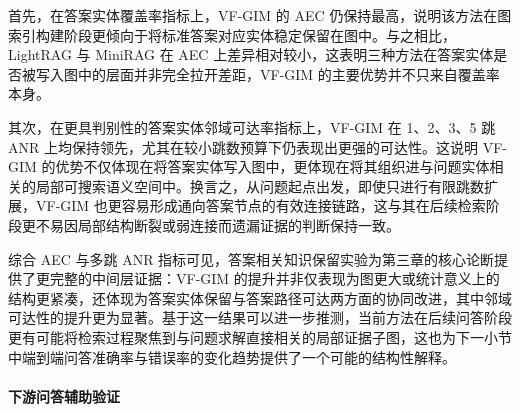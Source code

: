 \documentclass[promaster, vlined]{DissertUESTC}
\begin{document}
首先，在答案实体覆盖率指标上，VF-GIM 的 AEC 仍保持最高，说明该方法在图索引构建阶段更倾向于将标准答案对应实体稳定保留在图中。与之相比，LightRAG 与 MiniRAG 在 AEC 上差异相对较小，这表明三种方法在答案实体是否被写入图中的层面并非完全拉开差距，VF-GIM 的主要优势并不只来自覆盖率本身。

其次，在更具判别性的答案实体邻域可达率指标上，VF-GIM 在 1、2、3、5 跳 ANR 上均保持领先，尤其在较小跳数预算下仍表现出更强的可达性。这说明 VF-GIM 的优势不仅体现在将答案实体写入图中，更体现在将其组织进与问题实体相关的局部可搜索语义空间中。换言之，从问题起点出发，即使只进行有限跳数扩展，VF-GIM 也更容易形成通向答案节点的有效连接链路，这与其在后续检索阶段更不易因局部结构断裂或弱连接而遗漏证据的判断保持一致。

综合 AEC 与多跳 ANR 指标可见，答案相关知识保留实验为第三章的核心论断提供了更完整的中间层证据：VF-GIM 的提升并非仅表现为图更大或统计意义上的结构更紧凑，还体现为答案实体保留与答案路径可达两方面的协同改进，其中邻域可达性的提升更为显著。基于这一结果可以进一步推测，当前方法在后续问答阶段更有可能将检索过程聚焦到与问题求解直接相关的局部证据子图，这也为下一小节中端到端问答准确率与错误率的变化趋势提供了一个可能的结构性解释。

\paragraph{下游问答辅助验证}
\end{document}
